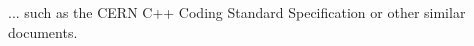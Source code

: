 ... such as the CERN C++ Coding Standard Specification \citep{bib_CERNcpp} or other similar
  documents.
